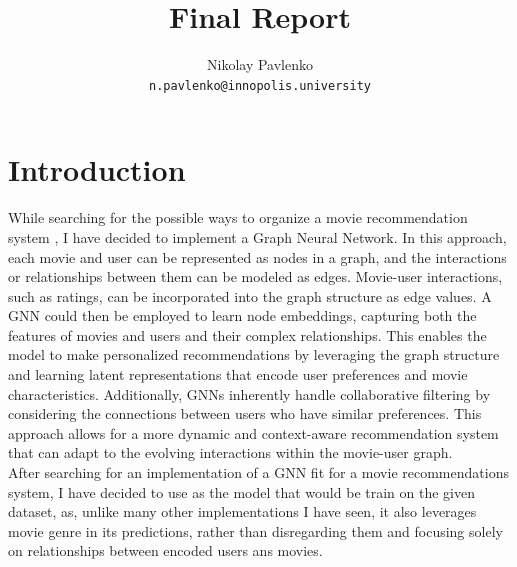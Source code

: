 \documentclass[]{article}
\title{Final Report}
\author{
	Nikolay Pavlenko\\
	\texttt{n.pavlenko@innopolis.university}
}
\begin{document}
	\maketitle
	\section{Introduction}
	While searching for the possible ways to organize a movie recommendation system , I have decided to implement a Graph Neural Network. In this approach, each movie and user can be represented as nodes in a graph, and the interactions or relationships between them can be modeled as edges. Movie-user interactions, such as ratings, can be incorporated into the graph structure as edge values. A GNN could then be employed to learn node embeddings, capturing both the features of movies and users and their complex relationships. This enables the model to make personalized recommendations by leveraging the graph structure and learning latent representations that encode user preferences and movie characteristics. Additionally, GNNs inherently handle collaborative filtering by considering the connections between users who have similar preferences. This approach allows for a more dynamic and context-aware recommendation system that can adapt to the evolving interactions within the movie-user graph. \\
	
	After searching for an implementation of a GNN fit for a movie recommendations system, I have decided to use \cite{main} as the model that would be train on the given dataset, as, unlike many other implementations I have seen, it also leverages movie genre in its predictions, rather than disregarding them and focusing solely on relationships between encoded users ans movies. 
	\\
\end{document}
